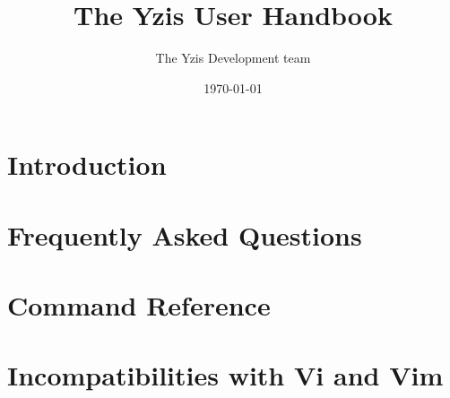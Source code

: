 \documentclass[a4paper,12pt]{report}
\title{The Yzis User Handbook}
\date{\today}
\author{The Yzis Development team}
\begin{document}
\maketitle
\tableofcontents

% 


\chapter{Introduction}



\chapter{Frequently Asked Questions}



\chapter{Command Reference}



\chapter{Incompatibilities with Vi and Vim}
\end{document}
